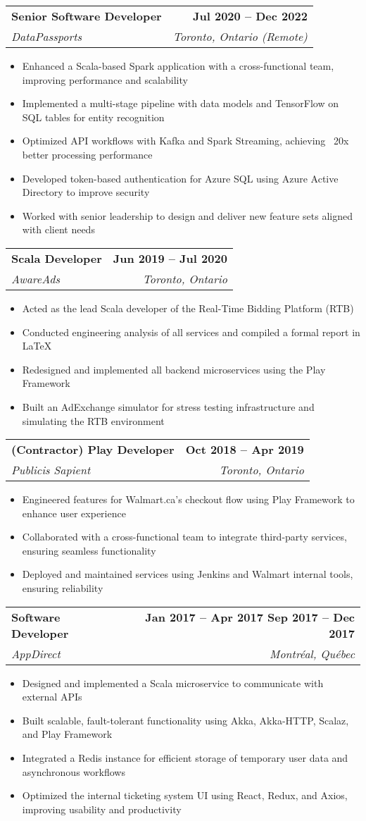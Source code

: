 \documentclass[letterpaper,11pt]{article}
\makeatletter
\newcommand{\resumeItem}[1]{
  \item\small{
    {#1 \vspace{-1pt}}
  }
}
\newcommand{\resumeSubheading}[4]{
  \vspace{-3pt}\item
    \begin{tabular*}{0.97\textwidth}[t]{l@{\extracolsep{\fill}}r}
      \textbf{#1} & {\small \textbf{#2}} \\
      \textit{\fontsize{10}{11}\selectfont #3} & \textit{\fontsize{8}{10}\selectfont \textcolor{awesome-skyblue}{#4}} \\  %
    \end{tabular*}\vspace{-1pt}
}
\newcommand{\resumeItemListStart}{\begin{itemize}}
\newcommand{\resumeItemListEnd}{\end{itemize}\vspace{2pt}}
\makeatother
\begin{document}
\resumeSubheading
  {Senior Software Developer}{Jul 2020 -- Dec 2022}
  {DataPassports}{Toronto, Ontario (Remote)}
  \resumeItemListStart
    \resumeItem{Enhanced a Scala-based Spark application with a cross-functional team, improving performance and scalability}
    \resumeItem{Implemented a multi-stage pipeline with data models and TensorFlow on SQL tables for entity recognition}
    \resumeItem{Optimized API workflows with Kafka and Spark Streaming, achieving ~20x better processing performance}
    \resumeItem{Developed token-based authentication for Azure SQL using Azure Active Directory to improve security}
    \resumeItem{Worked with senior leadership to design and deliver new feature sets aligned with client needs}
  \resumeItemListEnd

\resumeSubheading
  {Scala Developer}{Jun 2019 -- Jul 2020}
  {AwareAds}{Toronto, Ontario}
  \resumeItemListStart
    \resumeItem{Acted as the lead Scala developer of the Real-Time Bidding Platform (RTB)}
    \resumeItem{Conducted engineering analysis of all services and compiled a formal report in \LaTeX}
    \resumeItem{Redesigned and implemented all backend microservices using the Play Framework}
    \resumeItem{Built an AdExchange simulator for stress testing infrastructure and simulating the RTB environment}
  \resumeItemListEnd

\resumeSubheading
  {(Contractor) Play Developer}{Oct 2018 -- Apr 2019}
  {Publicis Sapient}{Toronto, Ontario}
  \resumeItemListStart
    \resumeItem{Engineered features for Walmart.ca’s checkout flow using Play Framework to enhance user experience}
    \resumeItem{Collaborated with a cross-functional team to integrate third-party services, ensuring seamless functionality}
    \resumeItem{Deployed and maintained services using Jenkins and Walmart internal tools, ensuring reliability}
  \resumeItemListEnd

\resumeSubheading
  {Software Developer}
  {Jan 2017 -- Apr 2017 \textnormal{ \textbar } Sep 2017 -- Dec 2017}	
  {AppDirect}{Montréal, Québec}
  \resumeItemListStart
    \resumeItem{Designed and implemented a Scala microservice to communicate with external APIs}
	\resumeItem{Built scalable, fault-tolerant functionality using Akka, Akka-HTTP, Scalaz, and Play Framework}
    \resumeItem{Integrated a Redis instance for efficient storage of temporary user data and asynchronous workflows}
	\resumeItem{Optimized the internal ticketing system UI using React, Redux, and Axios, improving usability and productivity}
  \resumeItemListEnd
\end{document}
